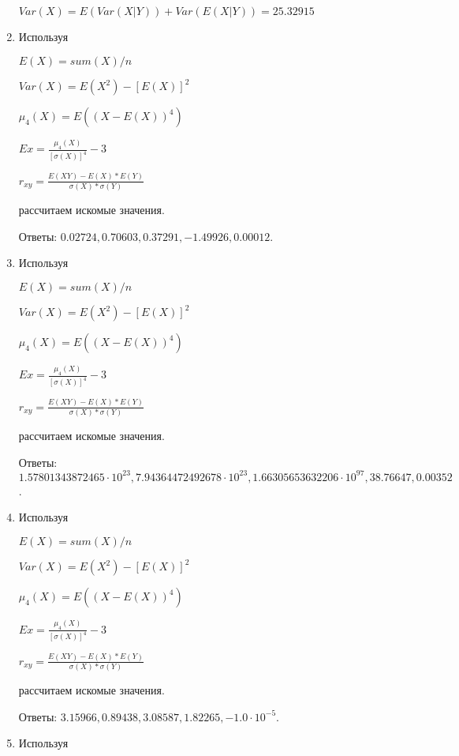 \documentclass[a4paper,12pt]{article}
\begin{document}
\begin{enumerate}
	$Var(X) = E(Var(X|Y)) + Var(E(X|Y)) = 25.32915$
	


\item

    
    Используя

	$E(X) = sum(X) / n$

	$Var(X) = E(X^2) - [E(X)]^2$

	$\mu_4(X) = E((X-E(X))^4)$

	$Ex = \frac{\mu_4(X)}{[\sigma(X)]^4} - 3$

	$r_{xy} = \frac{E(XY) - E(X) * E(Y)}{\sigma(X) * \sigma(Y)}$

    рассчитаем искомые значения.

    Ответы: $0.02724, 0.70603, 0.37291, -1.49926, 0.00012$.

    


\item

    
    Используя

	$E(X) = sum(X) / n$

	$Var(X) = E(X^2) - [E(X)]^2$

	$\mu_4(X) = E((X-E(X))^4)$

	$Ex = \frac{\mu_4(X)}{[\sigma(X)]^4} - 3$

	$r_{xy} = \frac{E(XY) - E(X) * E(Y)}{\sigma(X) * \sigma(Y)}$

    рассчитаем искомые значения.

    Ответы: $1.57801343872465 \cdot 10^{23}, 7.94364472492678 \cdot 10^{23}, 1.66305653632206 \cdot 10^{97}, 38.76647, 0.00352$.

    


\item

    
    Используя

	$E(X) = sum(X) / n$

	$Var(X) = E(X^2) - [E(X)]^2$

	$\mu_4(X) = E((X-E(X))^4)$

	$Ex = \frac{\mu_4(X)}{[\sigma(X)]^4} - 3$

	$r_{xy} = \frac{E(XY) - E(X) * E(Y)}{\sigma(X) * \sigma(Y)}$

    рассчитаем искомые значения.

    Ответы: $3.15966, 0.89438, 3.08587, 1.82265, -1.0 \cdot 10^{-5}$.

    


\item

    
    Используя


\end{enumerate}
\end{document}
